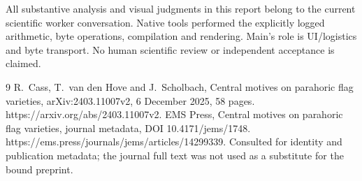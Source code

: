 \documentclass[10pt]{article}
\begin{document}
All substantive analysis and visual judgments in this report belong to the current scientific worker conversation. Native tools performed the explicitly logged arithmetic, byte operations, compilation and rendering. Main’s role is UI/logistics and byte transport. No human scientific review or independent acceptance is claimed.\par
9 R. Cass, T. van den Hove and J. Scholbach, Central motives on parahoric flag varieties, arXiv:2403.11007v2, 6 December 2025, 58 pages. https://arxiv.org/abs/2403.11007v2. EMS Press, Central motives on parahoric flag varieties, journal metadata, DOI 10.4171/jems/1748. https://ems.press/journals/jems/articles/14299339. Consulted for identity and publication metadata; the journal full text was not used as a substitute for the bound preprint.\par
\end{document}

